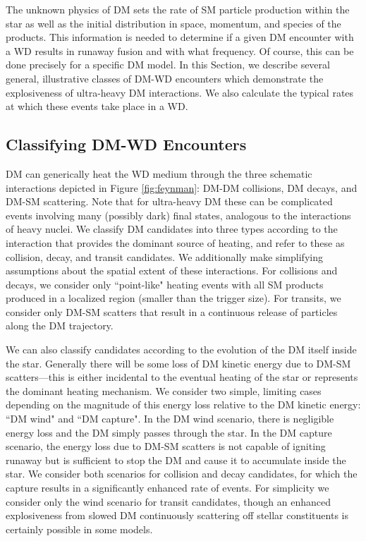 The unknown physics of DM sets the rate of SM particle production within the star as well as the initial distribution in space, momentum, and species of the products.
This information is needed to determine if a given DM encounter with a WD results in runaway fusion and with what frequency.
Of course, this can be done precisely for a specific DM model.
In this Section, we describe several general, illustrative classes of DM-WD encounters which demonstrate the explosiveness of ultra-heavy DM interactions.
We also calculate the typical rates at which these events take place in a WD.

\subsection{Classifying DM-WD Encounters}

DM can generically heat the WD medium through the three schematic interactions depicted in Figure \ref{fig:feynman}: DM-DM collisions, DM decays, and DM-SM scattering.
Note that for ultra-heavy DM these can be complicated events involving many (possibly dark) final states, analogous to the interactions of heavy nuclei.
We classify DM candidates into three types according to the interaction that provides the dominant source of heating, and refer to these as collision, decay, and transit candidates.
We additionally make simplifying assumptions about the spatial extent of these interactions.
For collisions and decays, we consider only ``point-like" heating events with all SM products produced in a localized region (smaller than the trigger size).
For transits, we consider only DM-SM scatters that result in a continuous release of particles along the DM trajectory.

We can also classify candidates according to the evolution of the DM itself inside the star.
Generally there will be some loss of DM kinetic energy due to DM-SM scatters---this is either incidental to the eventual heating of the star or represents the dominant heating mechanism.
We consider two simple, limiting cases depending on the magnitude of this energy loss relative to the DM kinetic energy: ``DM wind" and ``DM capture".
In the DM wind scenario, there is negligible energy loss and the DM simply passes through the star.
In the DM capture scenario, the energy loss due to DM-SM scatters is not capable of igniting runaway but is sufficient to stop the DM and cause it to accumulate inside the star.
We consider both scenarios for collision and decay candidates, for which the capture results in a significantly enhanced rate of events.
For simplicity we consider only the wind scenario for transit candidates, though an enhanced explosiveness from slowed DM continuously scattering off stellar constituents is certainly possible in some models.

